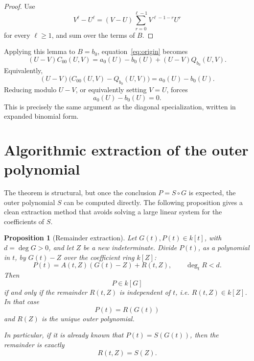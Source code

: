 \documentclass[11pt]{article}
\theoremstyle{plain}
\newtheorem{proposition}[theorem]{Proposition}
\theoremstyle{definition}
\theoremstyle{remark}
\newcommand{\U}{U}
\newcommand{\V}{V}
\begin{document}
\begin{proof}
Use
\[
    \V^\ell-\U^\ell
    =
    (\V-\U)\sum_{r=0}^{\ell-1}\V^{\ell-1-r}\U^r
\]
for every \(\ell\geq 1\), and sum over the terms of \(B\).
\end{proof}

Applying this lemma to \(B=b_0\), equation~\eqref{eq:origin} becomes
\[
    (\U-\V)C_{00}(\U,\V)
    =
    a_0(\U)-b_0(\U)+(\U-\V)Q_{b_0}(\U,\V).
\]
Equivalently,
\[
    (\U-\V)\bigl(C_{00}(\U,\V)-Q_{b_0}(\U,\V)\bigr)
    =
    a_0(\U)-b_0(\U).
\]
Reducing modulo \(\U-\V\), or equivalently setting \(\V=\U\), forces
\[
    a_0(\U)-b_0(\U)=0.
\]
This is precisely the same argument as the diagonal specialization, written in expanded binomial form.

\section{Algorithmic extraction of the outer polynomial}

The theorem is structural, but once the conclusion \(P=S\circ G\) is expected, the outer polynomial \(S\) can be computed directly. The following proposition gives a clean extraction method that avoids solving a large linear system for the coefficients of \(S\).

\begin{proposition}[Remainder extraction]\label{prop:algorithmic-extraction}
Let \(G(t),P(t)\in k[t]\), with \(d=\deg G>0\), and let \(Z\) be a new indeterminate. Divide \(P(t)\), as a polynomial in \(t\), by \(G(t)-Z\) over the coefficient ring \(k[Z]\):
\[
    P(t)=A(t,Z)(G(t)-Z)+R(t,Z),
    \qquad \deg_t R<d.
\]
Then
\[
    P\in k[G]
\]
if and only if the remainder \(R(t,Z)\) is independent of \(t\), i.e. \(R(t,Z)\in k[Z]\). In that case
\[
    P(t)=R(G(t))
\]
and \(R(Z)\) is the unique outer polynomial.

In particular, if it is already known that \(P(t)=S(G(t))\), then the remainder is exactly
\[
    R(t,Z)=S(Z).
\]
\end{proposition}
\end{document}
